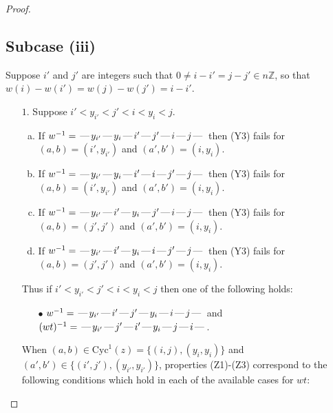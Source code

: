 \documentclass[10pt]{article}
\theoremstyle{definition}
\theoremstyle{definition}
\def\dash{\text{\hspace{0.5mm}---\hspace{0.5mm}}}
\def\Cyc{\mathrm{Cyc}}
\def\ZZ{\mathbb{Z}}
\begin{document}
\begin{proof}
\subsection{Subcase (iii)}
Suppose $i'$ and $j'$ are integers such that
$0\neq i - i' = j - j' \in n\ZZ$,
so that $w(i) - w(i') = w(j) - w(j') = i - i'$.
\begin{enumerate}
\item[$1$.] Suppose $i' < y_{i'} < j' < i < y_i < j$.
\begin{enumerate}[(a)]
\item If $w^{-1} = \dash y_{i'}\dash y_i\dash i'\dash j'\dash i\dash j\dash $ then (Y3) fails for $(a,b)=(i',y_{i'})$ and $(a',b')=(i,y_i)$.
\item If $w^{-1} = \dash y_{i'}\dash y_i\dash i'\dash i\dash j'\dash j\dash $ then (Y3) fails for $(a,b)=(i',y_{i'})$ and $(a',b')=(i,y_i)$.
\item If $w^{-1} = \dash y_{i'}\dash i'\dash y_i\dash j'\dash i\dash j\dash $ then (Y3) fails for $(a,b)=(j',j')$ and $(a',b')=(i,y_i)$.
\item If $w^{-1} = \dash y_{i'}\dash i'\dash y_i\dash i\dash j'\dash j\dash $ then (Y3) fails for $(a,b)=(j',j')$ and $(a',b')=(i,y_i)$.
\end{enumerate}
Thus if $i' < y_{i'} < j' < i < y_i < j$ then one of the following holds:
\begin{enumerate}
\item[$\bullet$] $w^{-1} = \dash y_{i'}\dash i'\dash j'\dash y_i\dash i\dash j\dash $ and $(wt)^{-1} = \dash y_{i'}\dash j'\dash i'\dash y_i\dash j\dash i\dash $.
\end{enumerate}
When $(a,b)\in\Cyc^1(z)=\{(i,j),(y_i,y_i)\}$ and $(a',b')\in\{(i',j'),(y_{i'},y_{i'})\}$,
properties (Z1)-(Z3) correspond to the following conditions which
hold in each of the available cases for $wt$:
\end{enumerate}
\end{proof}
\end{document}
